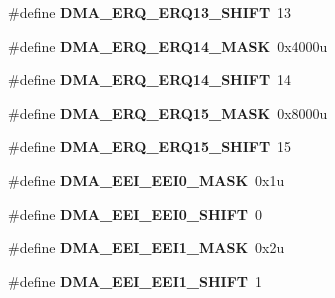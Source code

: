 \begin{DoxyCompactItemize}
\item 
\#define {\bfseries D\+M\+A\+\_\+\+E\+R\+Q\+\_\+\+E\+R\+Q13\+\_\+\+S\+H\+I\+FT}~13\hypertarget{group__DMA__Register__Masks_ga6f9c1d06b1178678800d9a14df8b79ba}{}\label{group__DMA__Register__Masks_ga6f9c1d06b1178678800d9a14df8b79ba}

\item 
\#define {\bfseries D\+M\+A\+\_\+\+E\+R\+Q\+\_\+\+E\+R\+Q14\+\_\+\+M\+A\+SK}~0x4000u\hypertarget{group__DMA__Register__Masks_ga41e772c4e32bb0c2546bd32b9207aece}{}\label{group__DMA__Register__Masks_ga41e772c4e32bb0c2546bd32b9207aece}

\item 
\#define {\bfseries D\+M\+A\+\_\+\+E\+R\+Q\+\_\+\+E\+R\+Q14\+\_\+\+S\+H\+I\+FT}~14\hypertarget{group__DMA__Register__Masks_gaa8b288df3c11c83516e460ec8f1c06b6}{}\label{group__DMA__Register__Masks_gaa8b288df3c11c83516e460ec8f1c06b6}

\item 
\#define {\bfseries D\+M\+A\+\_\+\+E\+R\+Q\+\_\+\+E\+R\+Q15\+\_\+\+M\+A\+SK}~0x8000u\hypertarget{group__DMA__Register__Masks_ga6152f3575742083b05d6df10bd9d09e5}{}\label{group__DMA__Register__Masks_ga6152f3575742083b05d6df10bd9d09e5}

\item 
\#define {\bfseries D\+M\+A\+\_\+\+E\+R\+Q\+\_\+\+E\+R\+Q15\+\_\+\+S\+H\+I\+FT}~15\hypertarget{group__DMA__Register__Masks_ga49ce30d8d6925a45dfc85fdf08b71bfd}{}\label{group__DMA__Register__Masks_ga49ce30d8d6925a45dfc85fdf08b71bfd}

\item 
\#define {\bfseries D\+M\+A\+\_\+\+E\+E\+I\+\_\+\+E\+E\+I0\+\_\+\+M\+A\+SK}~0x1u\hypertarget{group__DMA__Register__Masks_gaacd526dbbb455151535c6e8d7e371477}{}\label{group__DMA__Register__Masks_gaacd526dbbb455151535c6e8d7e371477}

\item 
\#define {\bfseries D\+M\+A\+\_\+\+E\+E\+I\+\_\+\+E\+E\+I0\+\_\+\+S\+H\+I\+FT}~0\hypertarget{group__DMA__Register__Masks_gac4abb698bc75b24811557b2037d828c6}{}\label{group__DMA__Register__Masks_gac4abb698bc75b24811557b2037d828c6}

\item 
\#define {\bfseries D\+M\+A\+\_\+\+E\+E\+I\+\_\+\+E\+E\+I1\+\_\+\+M\+A\+SK}~0x2u\hypertarget{group__DMA__Register__Masks_gabb59616391e640e07162d0d33c0382d9}{}\label{group__DMA__Register__Masks_gabb59616391e640e07162d0d33c0382d9}

\item 
\#define {\bfseries D\+M\+A\+\_\+\+E\+E\+I\+\_\+\+E\+E\+I1\+\_\+\+S\+H\+I\+FT}~1\hypertarget{group__DMA__Register__Masks_ga9c162765569a8cc74e648841337f09e2}{}\label{group__DMA__Register__Masks_ga9c162765569a8cc74e648841337f09e2}


\end{DoxyCompactItemize}
